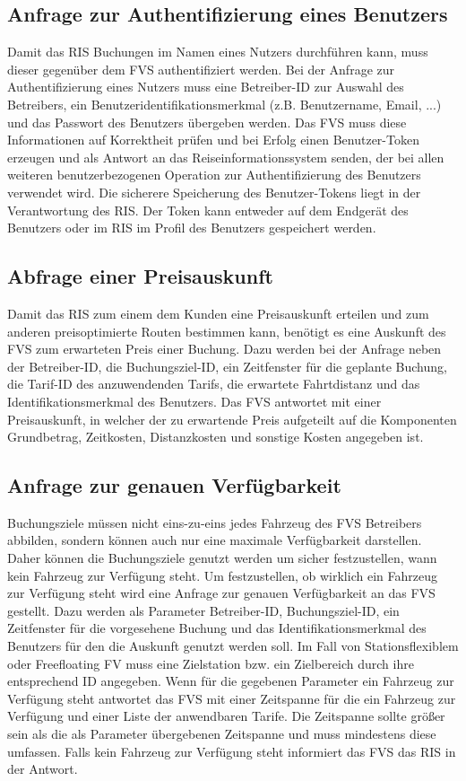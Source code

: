 \subsection{Anfrage zur Authentifizierung eines Benutzers}
Damit das RIS Buchungen im Namen eines Nutzers durchführen kann, muss dieser gegenüber dem FVS authentifiziert werden. Bei der Anfrage zur Authentifizierung eines Nutzers muss eine Betreiber-ID zur Auswahl des Betreibers, ein Benutzeridentifikationsmerkmal (z.B. Benutzername, Email, ...) und das Passwort des Benutzers übergeben werden. Das FVS muss diese Informationen auf Korrektheit prüfen und bei Erfolg einen Benutzer-Token erzeugen und als Antwort an das Reiseinformationssystem senden, der bei allen weiteren benutzerbezogenen Operation zur Authentifizierung des Benutzers verwendet wird. Die sicherere Speicherung des Benutzer-Tokens liegt in der Verantwortung des RIS. Der Token kann entweder auf dem Endgerät des Benutzers oder im RIS im Profil des Benutzers gespeichert werden.

\subsection{Abfrage einer Preisauskunft}
 Damit das RIS zum einem dem Kunden eine Preisauskunft erteilen und zum anderen preisoptimierte Routen bestimmen kann, benötigt es eine Auskunft des FVS zum erwarteten Preis einer Buchung. Dazu werden bei der Anfrage neben der Betreiber-ID, die Buchungsziel-ID, ein Zeitfenster für die geplante Buchung, die Tarif-ID des anzuwendenden Tarifs, die erwartete Fahrtdistanz und das Identifikationsmerkmal des Benutzers. Das FVS antwortet mit einer Preisauskunft, in welcher der zu erwartende Preis aufgeteilt auf die Komponenten Grundbetrag, Zeitkosten, Distanzkosten und sonstige Kosten angegeben ist.
 
\subsection{Anfrage zur genauen Verfügbarkeit}
Buchungsziele müssen nicht eins-zu-eins jedes Fahrzeug des FVS Betreibers abbilden, sondern können auch nur eine maximale Verfügbarkeit darstellen. Daher können die Buchungsziele genutzt werden um sicher festzustellen, wann kein Fahrzeug zur Verfügung steht. Um festzustellen, ob wirklich ein Fahrzeug zur Verfügung steht wird eine Anfrage zur genauen Verfügbarkeit an das FVS gestellt. Dazu werden als Parameter Betreiber-ID, Buchungsziel-ID, ein Zeitfenster für die vorgesehene Buchung und das Identifikationsmerkmal des Benutzers für den die Auskunft genutzt werden soll. Im Fall von Stationsflexiblem oder Freefloating FV muss eine Zielstation bzw. ein Zielbereich durch ihre entsprechend ID angegeben. Wenn für die gegebenen Parameter ein Fahrzeug zur Verfügung steht antwortet das FVS mit einer Zeitspanne für die ein Fahrzeug zur Verfügung und einer Liste der anwendbaren Tarife. Die Zeitspanne sollte größer sein als die als Parameter übergebenen Zeitspanne und muss mindestens diese umfassen. Falls kein Fahrzeug zur Verfügung  steht informiert das FVS das RIS in der Antwort.

